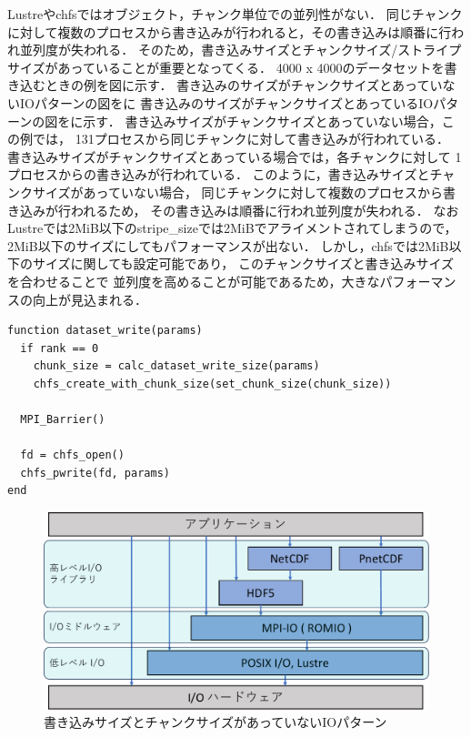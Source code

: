 \documentclass[submit,techrep,noauthor]{ipsj}
\begin{document}
Lustreやchfsではオブジェクト，チャンク単位での並列性がない．
同じチャンクに対して複数のプロセスから書き込みが行われると，その書き込みは順番に行われ並列度が失われる．
そのため，書き込みサイズとチャンクサイズ/ストライプサイズがあっていることが重要となってくる．
4000 x 4000のデータセットを書き込むときの例を図に示す．
書き込みのサイズがチャンクサイズとあっていないIOパターンの図をに
書き込みのサイズがチャンクサイズとあっているIOパターンの図をに示す．
書き込みサイズがチャンクサイズとあっていない場合，この例では，
131プロセスから同じチャンクに対して書き込みが行われている．
書き込みサイズがチャンクサイズとあっている場合では，各チャンクに対して
1プロセスからの書き込みが行われている．
このように，書き込みサイズとチャンクサイズがあっていない場合，
同じチャンクに対して複数のプロセスから書き込みが行われるため，
その書き込みは順番に行われ並列度が失われる．
なおLustreでは2MiB以下のstripe\_sizeでは2MiBでアライメントされてしまうので，
2MiB以下のサイズにしてもパフォーマンスが出ない．
しかし，chfsでは2MiB以下のサイズに関しても設定可能であり，
このチャンクサイズと書き込みサイズを合わせることで
並列度を高めることが可能であるため，大きなパフォーマンスの向上が見込まれる．

\begin{lstlisting}[caption=チャンクサイズの決定,label=lst:chunksize]
function dataset_write(params)
  if rank == 0
    chunk_size = calc_dataset_write_size(params)
    chfs_create_with_chunk_size(set_chunk_size(chunk_size))
  
  MPI_Barrier()

  fd = chfs_open()
  chfs_pwrite(fd, params)
end
\end{lstlisting}

\newpage

\begin{figure}[tbp]
	\centering
	\includegraphics[page=11,width=\linewidth]{figure-crop.pdf}
	\caption{書き込みサイズとチャンクサイズがあっていないIOパターン}
	\label{fig:wrongio}
\end{figure}
\end{document}
